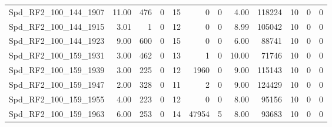 \begin{longtable}[c]{@{}lrrrrrrrrrrr@{}}
Spd\_RF2\_100\_144\_1907     & 11.00                  & 476                     & 0                       & 15                     & 0                       & 0                       & 4.00                    & 118224                   & 10                       & 0                        & 0                        \\
Spd\_RF2\_100\_144\_1915     & 3.01                   & 1                       & 0                       & 12                     & 0                       & 0                       & 8.99                    & 105042                   & 10                       & 0                        & 0                        \\
Spd\_RF2\_100\_144\_1923     & 9.00                   & 600                     & 0                       & 15                     & 0                       & 0                       & 6.00                    & 88741                    & 10                       & 0                        & 0                        \\
Spd\_RF2\_100\_159\_1931     & 3.00                   & 462                     & 0                       & 13                     & 1                       & 0                       & 10.00                   & 71746                    & 10                       & 0                        & 0                        \\
Spd\_RF2\_100\_159\_1939     & 3.00                   & 225                     & 0                       & 12                     & 1960                    & 0                       & 9.00                    & 115143                   & 10                       & 0                        & 0                        \\
Spd\_RF2\_100\_159\_1947     & 2.00                   & 328                     & 0                       & 11                     & 2                       & 0                       & 9.00                    & 124429                   & 10                       & 0                        & 0                        \\
Spd\_RF2\_100\_159\_1955     & 4.00                   & 223                     & 0                       & 12                     & 0                       & 0                       & 8.00                    & 95156                    & 10                       & 0                        & 0                        \\
Spd\_RF2\_100\_159\_1963     & 6.00                   & 253                     & 0                       & 14                     & 47954                   & 5                       & 8.00                    & 93683                    & 10                       & 0                        & 0                        \\

\end{longtable}
